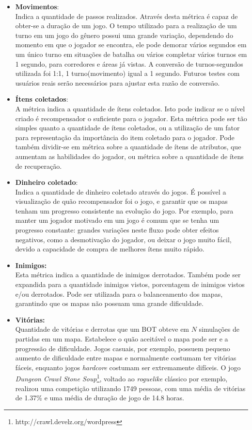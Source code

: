 \begin{itemize}
	\item \textbf{Movimentos}:\\
		Indica a quantidade de passos realizados. Através desta métrica é capaz de obter-se a duração de um jogo. O tempo utilizado para a realização de um turno em um jogo do gênero possui uma grande variação, dependendo do momento em que o jogador se encontra, ele pode demorar vários segundos em um único turno em situações de batalha ou vários completar vários turnos em 1 segundo, para corredores e áreas já vistas. A conversão de turnos-segundos utilizada foi 1:1, 1 turno(movimento) igual a 1 segundo. Futuros testes com usuários reais serão necessários para ajustar esta razão de conversão.
	\item \textbf{Ítens coletados}:\\
		A métrica indica a quantidade de ítens coletados. Isto pode indicar se o nível criado é recompensador o suficiente para o jogador. Esta métrica pode ser tão simples quanto a quantidade de ítens coletados, ou a utilização de um fator para representação da importância do item coletado para o jogador. Pode também dividir-se em métrica sobre a quantidade de ítens de atributos, que aumentam as habilidades do jogador, ou métrica sobre a quantidade de ítens de recuperação. 
	\item \textbf{Dinheiro coletado}:\\
		Indica a quantidade de dinheiro coletado através do jogos. É possível a visualização de quão recompensador foi o jogo, e garantir que os mapas tenham um progresso consistente na evolução do jogo. Por exemplo, para manter um jogador motivado em um jogo é comum que se tenha um progresso constante: grandes variações neste fluxo pode obter efeitos negativos, como a desmotivação do jogador, ou deixar o jogo muito fácil, devido a capacidade de compra de melhores ítens muito rápido.
	\item \textbf{Inimigos:}\\
		Esta métrica indica a quantidade de inimigos derrotados. Também pode ser expandida para a quantidade inimigos vistos, porcentagem de inimigos vistos e/ou derrotados. 
		Pode ser utilizada para o balanceamento dos mapas, garantindo que os mapas não possuam uma grande dificuldade. 
	\item \textbf{Vitórias:}\\
		Quantidade de vitórias e derrotas que um BOT obteve em $N$ simulações de partidas em um mapa. Estabelece o quão aceitável o mapa pode ser e a progressão de dificuldade. Jogos casuais, por exemplo, possuem pequeno aumento de dificuldade entre mapas e normalmente costumam ter vitórias fáceis, enquanto jogos \textit{hardcore} costumam ser extremamente difíceis. O jogo \textit{Dungeon Crawl Stone Soup}\footnote{http://crawl.develz.org/wordpress}, voltado ao \textit{roguelike} clássico por exemplo, realizou uma competição \cite{contest} utilizando 1749 pessoas, com uma média de vitórias de 1.37\% e uma média de duração de jogo de 14.8 horas. 
\end{itemize}

